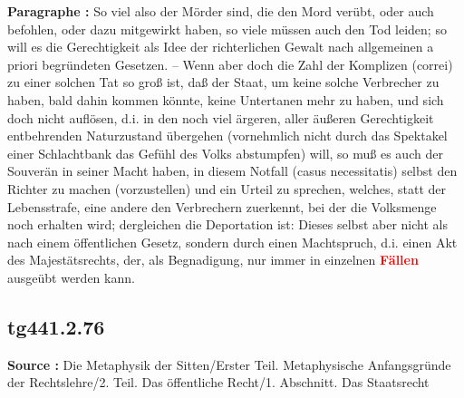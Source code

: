 \documentclass[a4paper,12pt,twoside]{book}
\newcommand{\match}[1]{\textcolor{red}{\textbf{#1}}}
\begin{document}
	\textbf{Paragraphe : }So viel also der Mörder sind, die den Mord verübt, oder auch befohlen, oder dazu mitgewirkt haben, so viele müssen auch den Tod leiden; so will es die Gerechtigkeit als Idee der richterlichen Gewalt nach allgemeinen a priori begründeten Gesetzen. – Wenn aber doch die Zahl der Komplizen (correi) zu einer solchen Tat so groß ist, daß der Staat, um keine solche Verbrecher zu haben, bald dahin kommen könnte, keine Untertanen mehr zu haben, und sich doch nicht auflösen, d.i. in den noch viel ärgeren, aller äußeren Gerechtigkeit entbehrenden Naturzustand übergehen (vornehmlich nicht durch das Spektakel einer Schlachtbank das Gefühl des Volks abstumpfen) will, so muß es auch der Souverän in seiner Macht haben, in diesem Notfall (casus necessitatis) selbst den Richter zu machen (vorzustellen) und ein Urteil zu sprechen, welches, statt der Lebensstrafe, eine andere den Verbrechern zuerkennt, bei der die Volksmenge noch erhalten wird; dergleichen die Deportation ist: Dieses selbst aber nicht als nach einem öffentlichen Gesetz, sondern durch einen Machtspruch, d.i. einen Akt des Majestätsrechts, der, als Begnadigung, nur immer in einzelnen \match{Fällen} ausgeübt werden kann. 
	
	\subsection*{tg441.2.76} 
	\textbf{Source : }Die Metaphysik der Sitten/Erster Teil. Metaphysische Anfangsgründe der Rechtslehre/2. Teil. Das öffentliche Recht/1. Abschnitt. Das Staatsrecht\\  
	
\end{document}

